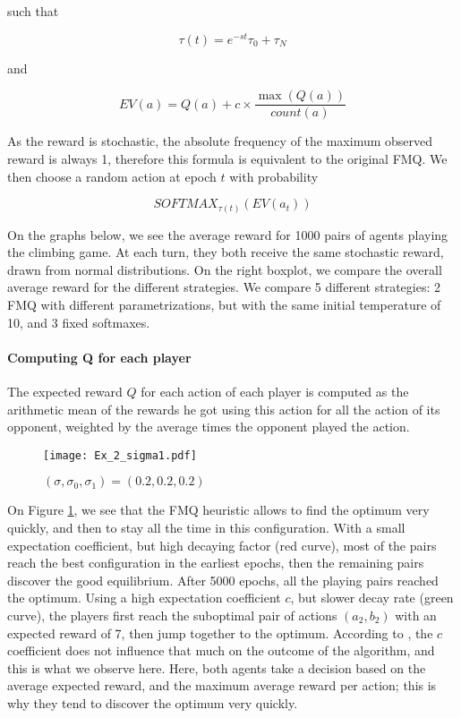 \documentclass[a4paper,11pt]{article}
\begin{document}
such that

$$\tau(t) = e^{-st}\tau_0 + \tau_N$$

and

$$EV(a) = Q(a) + c \times \frac{\max(Q(a))}{count(a)}$$

As the reward is stochastic, the absolute frequency of the maximum observed reward is always 1, therefore this formula is equivalent to the original FMQ. We then choose a random action at epoch $t$ with probability

$$SOFTMAX_{\tau(t)}(EV(a_t))$$

On the graphs below, we see the average reward for 1000 pairs of agents playing the climbing game. At each turn, they both receive the same stochastic reward, drawn from normal distributions. On the right boxplot, we compare the overall average reward for the different strategies. We compare 5 different strategies: 2 FMQ with different parametrizations, but with the same initial temperature of 10, and 3 fixed softmaxes.

\paragraph{Computing Q for each player}
The expected reward $Q$ for each action of each player is computed as the arithmetic mean of the rewards he got using this action for all the action of its opponent, weighted by the average times the opponent played the action.

\begin{figure}[H]
  \center
  \texttt{[image: Ex\_2\_sigma1.pdf]}
  \caption{\label{fig:2.1} $(\sigma, \sigma_{0}, \sigma_{1}) = (0.2, 0.2, 0.2)$}
\end{figure}

On Figure \ref{fig:2.1}, we see that the FMQ heuristic allows to find the optimum very quickly, and then to stay all the time in this configuration. With a small expectation coefficient, but high decaying factor (red curve), most of the pairs reach the best configuration in the earliest epochs, then the remaining pairs discover the good equilibrium. After 5000 epochs, all the playing pairs reached the optimum. Using a high expectation coefficient $c$, but slower decay rate (green curve), the players first reach the suboptimal pair of actions $(a_2, b_2)$ with an expected reward of 7, then jump together to the optimum. According to \cite{Kapetanakis2005}, the $c$ coefficient does not influence that much on the outcome of the algorithm, and this is what we observe here. Here, both agents take a decision based on the average expected reward, and the maximum average reward per action; this is why they tend to discover the optimum very quickly.
\end{document}
